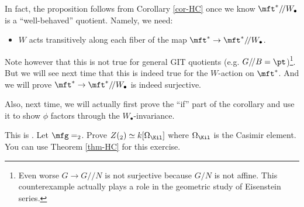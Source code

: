 \begin{rem}
	In fact, the proposition follows from Corollary \ref{cor-HC} once we know $\mft^*/\!/ W_\bullet$ is a ``well-behaved'' quotient. Namely, we need:
	\begin{itemize}
		\item $W$ acts transitively along each fiber of the map $\mft^* \to \mft^*/\!/ W_\bullet$.
	\end{itemize}
	Note however that this is not true for general GIT quotients (e.g. $G/\!/B = \pt$)\footnote{Even worse $G\to G/\!/N$ is not surjective because $G/N$ is not affine. This counterexample actually plays a role in the geometric study of Eisenstein series.}. But we will see next time that this is indeed true for the $W$-action on $\mft^*$. And we will prove $\mft^* \to \mft^*/\!/ W_\bullet$ is indeed surjective.

	Also, next time, we will actually first prove the ``if'' part of the corollary and use it to show $\phi$ factors through the $W_\bullet$-invariance.
\end{rem}


\begin{exe}
	This is . Let $\mfg=\sl_2$. Prove $Z(\sl_2)\simeq k[\Omega_\Kil]$ where $\Omega_\Kil$ is the Casimir element. You can use Theorem \ref{thm-HC} for this exercise.
\end{exe}


